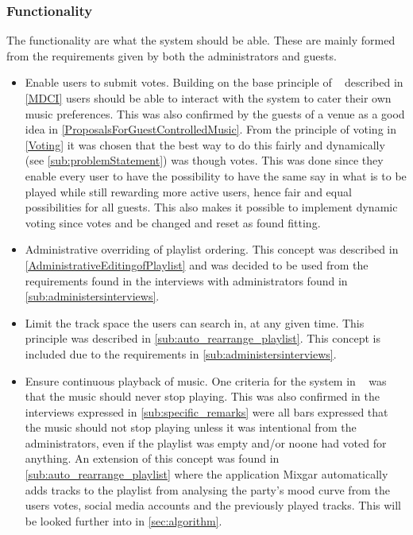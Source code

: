 \subsubsection{Functionality}
The functionality are what the system should be able. These are mainly formed from the requirements given by both the administrators and guests.
\begin{itemize}
    \item Enable users to submit votes. Building on the base principle of ~\cite{sorensen2012} described in \cref{MDCI} users should be able to interact with the system to cater their own music preferences. This was also confirmed by the guests of a venue as a good idea in \cref{ProposalsForGuestControlledMusic}. From the principle of voting in \cref{Voting} it was chosen that the best way to do this fairly and dynamically (see \cref{sub:problemStatement}) was though votes. This was done since they enable every user to have the possibility to have the same say in what is to be played while still rewarding more active users, hence fair and equal possibilities for all guests. This also makes it possible to implement dynamic voting since votes and be changed and reset as found fitting.
    \item Administrative overriding of playlist ordering. This concept was described in \cref{AdministrativeEditingofPlaylist} and was decided to be used from the requirements found in the interviews with administrators found in \cref{sub:administersinterviews}.
    \item Limit the track space the users can search in, at any given time. This principle was described in \cref{sub:auto_rearrange_playlist}. This concept is included due to the requirements in \cref{sub:administersinterviews}.
		\item Ensure continuous playback of music. One criteria for the system in ~\cite{sorensen2012} was that the music should never stop playing. This was also confirmed in the interviews expressed in \cref{sub:specific_remarks} were all bars expressed that the music should not stop playing unless it was intentional from the administrators, even if the playlist was empty and/or noone had voted for anything. An extension of this concept was found in \cref{sub:auto_rearrange_playlist} where the application Mixgar automatically adds tracks to the playlist from analysing the party’s mood curve from the users votes, social media accounts and the previously played tracks. This will be looked further into in \cref{sec:algorithm}.

\end{itemize}
